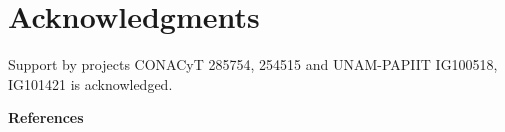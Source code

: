 \documentclass[10pt,letterpaper]{article} %
\begin{document}
\section{Acknowledgments} %
Support by projects CONACyT 285754, 254515 and UNAM-PAPIIT IG100518, IG101421 is
acknowledged. 


\nolinenumbers

%
%
% 
%


%
\textbf{References}


\newpage
\appendix
%
\end{document}
